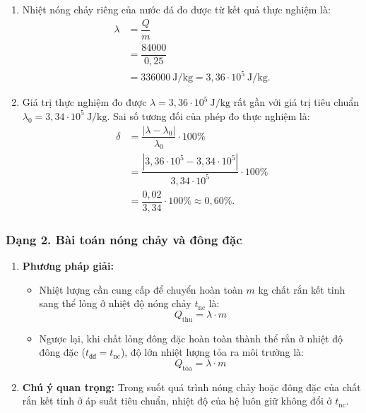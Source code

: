 \begin{vidumau}
{\begin{enumerate}
    Nhiệt lượng tỏa ra từ dây điện trở nhiệt trong khoảng thời gian đun $\Delta \tau = 4200\ \mathrm{s}$ là:
    \[
    \begin{aligned}
        Q &= \overline{P} \cdot \Delta \tau \\
          &= 20 \cdot 4200 \\
          &= 84000\ \mathrm{J} = 84\ \mathrm{kJ}.
    \end{aligned}
    \]
    \item Nhiệt nóng chảy riêng của nước đá đo được từ kết quả thực nghiệm là:
    \[
    \begin{aligned}
        \lambda &= \dfrac{Q}{m} \\
                &= \dfrac{84000}{0{,}25} \\
                &= 336000\ \mathrm{J/kg} = 3{,}36 \cdot 10^5\ \mathrm{J/kg}.
    \end{aligned}
    \]
    \item Giá trị thực nghiệm đo được $\lambda = 3{,}36 \cdot 10^5\ \mathrm{J/kg}$ rất gần với giá trị tiêu chuẩn $\lambda_0 = 3{,}34 \cdot 10^5\ \mathrm{J/kg}$.
    Sai số tương đối của phép đo thực nghiệm là:
    \[
    \begin{aligned}
        \delta &= \dfrac{|\lambda - \lambda_0|}{\lambda_0} \cdot 100\% \\
               &= \dfrac{|3{,}36 \cdot 10^5 - 3{,}34 \cdot 10^5|}{3{,}34 \cdot 10^5} \cdot 100\% \\
               &= \dfrac{0{,}02}{3{,}34} \cdot 100\% \approx 0{,}60\%.
    \end{aligned}
    \]
\end{enumerate}
}
\end{vidumau}

\subsubsection{Dạng 2. Bài toán nóng chảy và đông đặc}
\begin{phuongphap}
\begin{enumerate}
\item \textbf{Phương pháp giải:}
\begin{itemize}
    \item Nhiệt lượng cần cung cấp để chuyển hoàn toàn $m$ kg chất rắn kết tinh sang thể lỏng ở nhiệt độ nóng chảy $t_{\text{nc}}$ là:
    \[
    Q_{\text{thu}} = \lambda \cdot m
    \]
    \item Ngược lại, khi chất lỏng đông đặc hoàn toàn thành thể rắn ở nhiệt độ đông đặc ($t_{\text{đđ}} = t_{\text{nc}}$), độ lớn nhiệt lượng tỏa ra môi trường là:
    \[
    Q_{\text{tỏa}} = \lambda \cdot m
    \]
\end{itemize}
\item \textbf{Chú ý quan trọng:} Trong suốt quá trình nóng chảy hoặc đông đặc của chất rắn kết tinh ở áp suất tiêu chuẩn, nhiệt độ của hệ luôn giữ không đổi ở $t_{\text{nc}}$.
\end{enumerate}
\end{phuongphap}

